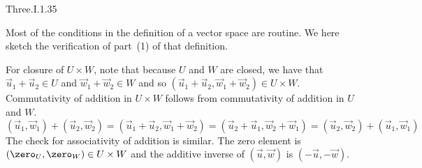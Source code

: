 \begin{ans}{Three.I.1.35}
      \begin{exparts}
        \partsitem Most of the conditions in the definition of a
          vector space are routine.
          We here sketch the verification of part~(1) of that definition.

          For closure of $U\times W$, note that because
          \( U \) and \( W \) are closed, we have that
          $\vec{u}_1+\vec{u}_2\in U$ and $\vec{w}_1+\vec{w}_2\in W$
          and so \( (\vec{u}_1+\vec{u}_2,\vec{w}_1+\vec{w}_2)\in U\times W \).
          Commutativity of addition in \( U\times W \) follows from
          commutativity of addition in \( U \) and \( W \).
          \begin{equation*}
             (\vec{u}_1,\vec{w}_1)+(\vec{u}_2,\vec{w}_2)=
                 (\vec{u}_1+\vec{u}_2,\vec{w}_1+\vec{w}_2)
                 =(\vec{u}_2+\vec{u}_1,\vec{w}_2+\vec{w}_1)
             =(\vec{u}_2,\vec{w}_2)+(\vec{u}_1,\vec{w}_1)
          \end{equation*}
          The check for associativity of addition is similar.
          The zero element is \( (\zero_U,\zero_W)\in U\times W \)
          and the additive inverse of
          \( (\vec{u},\vec{w}) \) is \( (-\vec{u},-\vec{w}) \).


\end{exparts}
\end{ans}
